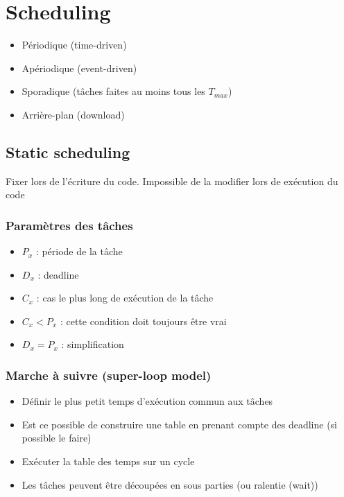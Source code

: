 \documentclass[resume]{subfiles}
\begin{document}
\section{Scheduling}
\begin{itemize}
\item Périodique (time-driven)
\item Apériodique (event-driven)
\item Sporadique (tâches faites au moins tous les $T_{max}$) 
\item Arrière-plan (download)
\end{itemize}

\subsection{Static scheduling}

Fixer lors de l'écriture du code. Impossible de la modifier lors de exécution du code

\subsubsection{Paramètres des tâches}
\begin{itemize}
\item $P_x$ : période de la tâche
\item $D_x$ : deadline
\item $C_x$ : cas le plus long de exécution de la tâche
\item $C_x < P_x$ : cette condition doit toujours être vrai
\item $D_x = P_x$ : simplification 
\end{itemize}

\subsubsection{Marche à suivre (super-loop model)}
\begin{itemize}
\item Définir le plus petit temps d'exécution commun aux tâches

\item Est ce possible de construire une table en prenant compte des deadline (si possible le faire)

\item Exécuter la table des temps sur un cycle

\item Les tâches peuvent être découpées en sous parties (ou ralentie (wait))
\end{itemize}
\end{document}
